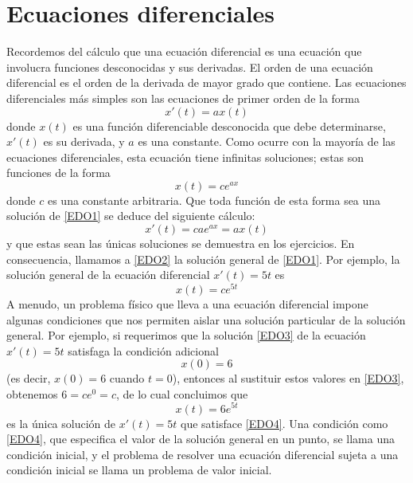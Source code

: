 \newpage

\section{Ecuaciones diferenciales}



Recordemos del cálculo que una ecuación diferencial es una ecuación que involucra funciones desconocidas y sus derivadas. El orden de una ecuación diferencial es el orden de la derivada de mayor grado que contiene. Las ecuaciones diferenciales más simples son las ecuaciones de primer orden de la forma
\begin{equation}
    x'(t) = ax(t) \label{EDO1}
\end{equation}
donde $x(t)$ es una función diferenciable desconocida que debe determinarse, $x'(t)$ es su derivada, y $a$ es una constante. Como ocurre con la mayoría de las ecuaciones diferenciales, esta ecuación tiene infinitas soluciones; estas son funciones de la forma
\begin{equation}
    x(t) = ce^{ax} \label{EDO2}
\end{equation}
donde $c$ es una constante arbitraria. Que toda función de esta forma sea una solución de \eqref{EDO1} se deduce del siguiente cálculo:
$$x'(t) = cae^{ax} = ax(t)$$
y que estas sean las únicas soluciones se demuestra en los ejercicios. En consecuencia, llamamos a \eqref{EDO2} la solución general de \eqref{EDO1}. Por ejemplo, la solución general de la ecuación diferencial $x'(t) = 5t$ es
\begin{equation}
   x(t) = ce^{5t} \label{EDO3}
\end{equation}
A menudo, un problema físico que lleva a una ecuación diferencial impone algunas condiciones que nos permiten aislar una solución particular de la solución general. Por ejemplo, si requerimos que la solución \eqref{EDO3} de la ecuación $x'(t) = 5t$ satisfaga la condición adicional
\begin{equation}
    x(0) = 6 \label{EDO4}
\end{equation}
(es decir, $x(0) = 6$ cuando $t = 0$), entonces al sustituir estos valores en \eqref{EDO3}, obtenemos $6 = ce^0 = c$, de lo cual concluimos que
$$x(t) = 6e^{5t}$$
es la única solución de $x'(t) = 5t$ que satisface \eqref{EDO4}. Una condición como \eqref{EDO4}, que especifica el valor de la solución general en un punto, se llama una condición inicial, y el problema de resolver una ecuación diferencial sujeta a una condición inicial se llama un problema de valor inicial.

